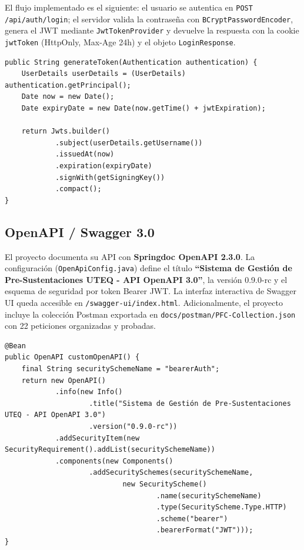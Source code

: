 El flujo implementado es el siguiente: el usuario se autentica en \texttt{POST /api/auth/login}; el servidor valida
la contraseña con \texttt{BCryptPasswordEncoder}, genera el JWT mediante \texttt{JwtTokenProvider} y devuelve
la respuesta con la cookie \texttt{jwtToken} (HttpOnly, Max-Age 24h) y el objeto \texttt{LoginResponse}.

\begin{lstlisting}[style=javaStyle, label=lst:jwt, caption={JwtTokenProvider.java — generación del token (fragmento)}]
public String generateToken(Authentication authentication) {
    UserDetails userDetails = (UserDetails) authentication.getPrincipal();
    Date now = new Date();
    Date expiryDate = new Date(now.getTime() + jwtExpiration);

    return Jwts.builder()
            .subject(userDetails.getUsername())
            .issuedAt(now)
            .expiration(expiryDate)
            .signWith(getSigningKey())
            .compact();
}
\end{lstlisting}

\subsection{OpenAPI / Swagger 3.0}

El proyecto documenta su API con \textbf{Springdoc OpenAPI 2.3.0}. La configuración (\texttt{OpenApiConfig.java})
define el título \textbf{``Sistema de Gestión de Pre-Sustentaciones UTEQ - API OpenAPI 3.0''}, la versión 0.9.0-rc
y el esquema de seguridad por token Bearer JWT. La interfaz interactiva de Swagger UI queda accesible en
\texttt{/swagger-ui/index.html}. Adicionalmente, el proyecto incluye la colección Postman exportada en
\texttt{docs/postman/PFC-Collection.json} con 22 peticiones organizadas y probadas.

\begin{lstlisting}[style=javaStyle, label=lst:oa, caption={OpenApiConfig.java — bean OpenAPI con Bearer auth (fragmento)}]
@Bean
public OpenAPI customOpenAPI() {
    final String securitySchemeName = "bearerAuth";
    return new OpenAPI()
            .info(new Info()
                    .title("Sistema de Gestión de Pre-Sustentaciones UTEQ - API OpenAPI 3.0")
                    .version("0.9.0-rc"))
            .addSecurityItem(new SecurityRequirement().addList(securitySchemeName))
            .components(new Components()
                    .addSecuritySchemes(securitySchemeName,
                            new SecurityScheme()
                                    .name(securitySchemeName)
                                    .type(SecurityScheme.Type.HTTP)
                                    .scheme("bearer")
                                    .bearerFormat("JWT")));
}
\end{lstlisting}
